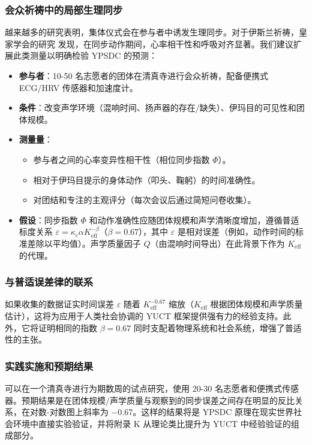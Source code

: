 \documentclass[12pt,a4paper]{article}
\newcommand{\Keff}{K_{\mathrm{eff}}}   %
\begin{document}
	\subsubsection{会众祈祷中的局部生理同步}
	越来越多的研究表明，集体仪式会在参与者中诱发生理同步。对于伊斯兰祈祷，皇家学会的研究 \cite{RoyalSociety2024} 发现，在同步动作期间，心率相干性和呼吸对齐显著。我们建议扩展此类测量以明确检验 YPSDC 的预测：
	
	\begin{itemize}
		\item \textbf{参与者}：10-50 名志愿者的团体在清真寺进行会众祈祷，配备便携式 ECG/HRV 传感器和加速度计。
		\item \textbf{条件}：改变声学环境（混响时间、扬声器的存在/缺失）、伊玛目的可见性和团体规模。
		\item \textbf{测量量}：
		\begin{itemize}
			\item 参与者之间的心率变异性相干性（相位同步指数 \(\Phi\)）。
			\item 相对于伊玛目提示的身体动作（叩头、鞠躬）的时间准确性。
			\item 对团结和专注的主观评分（每次会议后通过简短问卷收集）。
		\end{itemize}
		\item \textbf{假设}：同步指数 \(\Phi\) 和动作准确性应随团体规模和声学清晰度增加，遵循普适标度关系 \(\varepsilon = \kappa_c \alpha \Keff^{-\beta}\)（\(\beta=0.67\)），其中 \(\varepsilon\) 是相对误差（例如，动作时间的标准差除以平均值）。声学质量因子 \(Q\)（由混响时间导出）在此背景下作为 \(\Keff\) 的代理。
	\end{itemize}
	
	\subsubsection{与普适误差律的联系}
	如果收集的数据证实时间误差 \(\varepsilon\) 随着 \(\Keff^{-0.67}\) 缩放（\(\Keff\) 根据团体规模和声学质量估计），这将为应用于人类社会协调的 YUCT 框架提供强有力的经验支持。此外，它将证明相同的指数 \(\beta=0.67\) 同时支配着物理系统和社会系统，增强了普适性的主张。
	
	\subsubsection{实践实施和预期结果}
	可以在一个清真寺进行为期数周的试点研究，使用 20-30 名志愿者和便携式传感器。预期结果是在团体规模/声学质量与观察到的同步误差之间存在明显的反比关系，在对数-对数图上斜率为 \(-0.67\)。这样的结果将是 YPSDC 原理在现实世界社会环境中直接实验验证，并将附录 K 从理论类比提升为 YUCT 中经验验证的组成部分。
	
\end{document}
